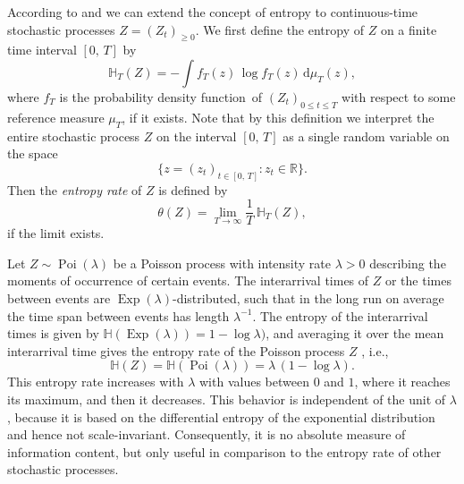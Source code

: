 \documentclass[smallextended]{svjour3}
\newcommand{\R}{\mathbb{R}}
\renewcommand{\H}{\mathbb{H}}
\newcommand{\Exp}{\operatorname{Exp}}
\newcommand{\Poi}{\operatorname{Poi}}
\newcommand{\liml}{\lim\limits}
\newcommand{\dd}[1]{\,\mathrm{d}#1}
\newcommand{\ie}{i.e.}
\newcommand{\pdf}{probability density function}
\begin{document}
According to \citet{Dumitrescu1988MICAS} and \citet{Girardin2003JAP} we can extend the concept of entropy to continuous-time stochastic processes $Z=(Z_t)_{\geq0}$.
We first define the entropy of $Z$ on a finite time interval $[0,\,T]$ by
\begin{equation*}
  \H_T(Z) = - \int f_T(z)\,\log f_T(z)\dd{\mu_T(z)},	 
\end{equation*}
where $f_T$ is the \pdf\ of $(Z_t)_{0\leq t\leq T}$ with respect to some reference measure $\mu_T$, if it exists.
Note that by this definition we interpret the entire stochastic process $Z$ on the interval $[0,\,T]$ as a single random variable on the space
\begin{equation*}
  \{z=(z_t)_{t\in[0,\,T]}: z_t\in\R\}.
\end{equation*}
Then the \emph{entropy rate} of $Z$ is defined by
\begin{equation*}
	\theta(Z) = \liml_{T\to\infty} \frac{1}{T}\,\H_T(Z),
\end{equation*}
if the limit exists.

Let $Z\sim\Poi(\lambda)$ be a Poisson process with intensity rate $\lambda>0$ describing the moments of occurrence of certain events.
The interarrival times of $Z$ or the times between events are $\Exp(\lambda)$-distributed, such that in the long run on average the time span between events has length $\lambda^{-1}$.
The entropy of the interarrival times is given by $\H(\Exp(\lambda))=1-\log \lambda)$, and averaging it over the mean interarrival time gives the entropy rate of the Poisson process $Z$ \citep[Section 3.3]{Gaspard1993PR}, \ie,
\begin{equation*}
  \H(Z) = \H(\Poi(\lambda)) = \lambda\,(1-\log \lambda).
\end{equation*}
This entropy rate increases with $\lambda$ with values between $0$ and $1$, where it reaches its maximum, and then it decreases.
This behavior is independent of the unit of $\lambda$, because it is based on the differential entropy of the exponential distribution and hence not scale-invariant.
Consequently, it is no absolute measure of information content, but only useful in comparison to the entropy rate of other stochastic processes.
\end{document}
